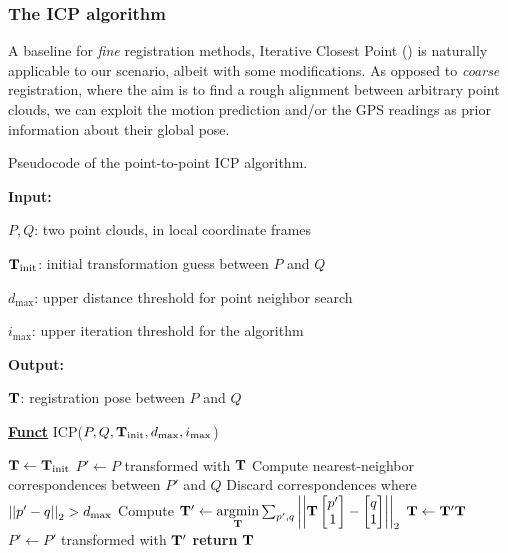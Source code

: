 \subsubsection{The ICP algorithm}
\newcommand{\pointp}{\vecx{p}}
\newcommand{\pointq}{\vecx{q}}
\newcommand{\matR}{\matx{R}}
\newcommand{\vect}{\vecx{t}}
\newcommand{\normalq}{\vecx{n}_{q}}
\newcommand{\covp}{\matx{C}_{p}}
\newcommand{\covq}{\matx{C}_{q}}
\newcommand{\distxpq}[1]{d_{#1}(\pointp, \pointq)}
\newcommand{\distpq}{\matR\pointp + \vect - \pointq}
\newcommand{\distpqi}{\matR\pointp_i + \vect - \pointq_i}
A baseline for \emph{fine} registration methods, Iterative Closest Point () is naturally applicable to our scenario, albeit with some modifications. As opposed to \emph{coarse} registration, where the aim is to find a rough alignment between arbitrary point clouds, we can exploit the motion prediction and/or the GPS readings as prior information about their global pose.

\newcommand{\distth}{d_\text{max}}
\newcommand{\iterth}{i_\text{max}}
\newcommand{\tguess}{\matx{T}_\text{init}}
\begin{algorithm}
	\caption[Pseudocode of the point-to-point ICP algorithm.]{Pseudocode of the point-to-point ICP algorithm.}
	\label{alg:pseudocode-icp}

	\textbf{Input:}
	\begin{compactitem}
		\item $P, Q$: two point clouds, in local coordinate frames
		\item $\tguess$: initial transformation guess between $P$ and $Q$
		\item $\distth$: upper distance threshold for point neighbor search
		\item $\iterth$: upper iteration threshold for the algorithm
	\end{compactitem}
	\textbf{Output:}
	\begin{compactitem}
		\item $\mathbf{T}$: registration pose between $P$ and $Q$
	\end{compactitem}
	\textbf{\underline{Funct}} ICP($P, Q, \tguess, \distth, \iterth$)
	\begin{algorithmic}[1] %
		\State $\pose \leftarrow \tguess$
		\State $P' \leftarrow P$ transformed with $\mathbf{T}$
		\For{$i=1, \dots, \iterth$}
		\State Compute nearest-neighbor correspondences between $P'$ and $Q$
		\State Discard correspondences where $\normtwo{p' - q} > \distth$
		\State Compute $\mathbf{T}' \leftarrow  \underset{\mathbf{T}}{\text{argmin}} \sum_{p', q}\left|\left|{\mathbf{T} \begin{bmatrix}
					p' \\1
				\end{bmatrix}  - \begin{bmatrix}q \\ 1\end{bmatrix}}\right|\right|_2$
		\State $\mathbf{T} \leftarrow \mathbf{T}'\mathbf{T}$ 
		\State $P' \leftarrow P'$ transformed with $\mathbf{T}'$ 
		\EndFor
		\State \textbf{return} $\mathbf{T}$
	\end{algorithmic}
\end{algorithm}

